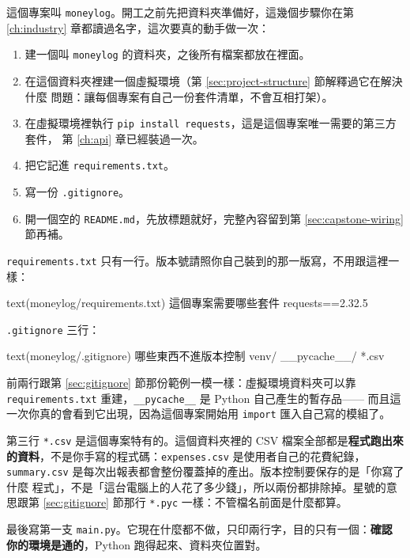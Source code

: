 這個專案叫 \texttt{moneylog}。開工之前先把資料夾準備好，這幾個步驟你在第 \ref{ch:industry}
章都讀過名字，這次要真的動手做一次：

\begin{enumerate}
\item 建一個叫 \texttt{moneylog} 的資料夾，之後所有檔案都放在裡面。
\item 在這個資料夾裡建一個虛擬環境（第 \ref{sec:project-structure} 節解釋過它在解決什麼
問題：讓每個專案有自己一份套件清單，不會互相打架）。
\item 在虛擬環境裡執行 \texttt{pip install requests}，這是這個專案唯一需要的第三方套件，
第 \ref{ch:api} 章已經裝過一次。
\item 把它記進 \texttt{requirements.txt}。
\item 寫一份 \texttt{.gitignore}。
\item 開一個空的 \texttt{README.md}，先放標題就好，完整內容留到第 \ref{sec:capstone-wiring}
節再補。
\end{enumerate}

\texttt{requirements.txt} 只有一行。版本號請照你自己裝到的那一版寫，不用跟這裡一樣：

\begin{code}{text}{(moneylog/requirements.txt) 這個專案需要哪些套件}
requests==2.32.5
\end{code}

\texttt{.gitignore} 三行：

\begin{code}{text}{(moneylog/.gitignore) 哪些東西不進版本控制}
venv/
__pycache__/
*.csv
\end{code}

前兩行跟第 \ref{sec:gitignore} 節那份範例一模一樣：虛擬環境資料夾可以靠
\texttt{requirements.txt} 重建，\texttt{\_\_pycache\_\_} 是 Python 自己產生的暫存品——
而且這一次你真的會看到它出現，因為這個專案開始用 \texttt{import} 匯入自己寫的模組了。

第三行 \texttt{*.csv} 是這個專案特有的。這個資料夾裡的 CSV 檔案全部都是\textbf{程式跑出來
的資料}，不是你手寫的程式碼：\texttt{expenses.csv} 是使用者自己的花費紀錄，
\texttt{summary.csv} 是每次出報表都會整份覆蓋掉的產出。版本控制要保存的是「你寫了什麼
程式」，不是「這台電腦上的人花了多少錢」，所以兩份都排除掉。星號的意思跟第
\ref{sec:gitignore} 節那行 \texttt{*.pyc} 一樣：不管檔名前面是什麼都算。

最後寫第一支 \texttt{main.py}。它現在什麼都不做，只印兩行字，目的只有一個：\textbf{確認
你的環境是通的}，Python 跑得起來、資料夾位置對。

